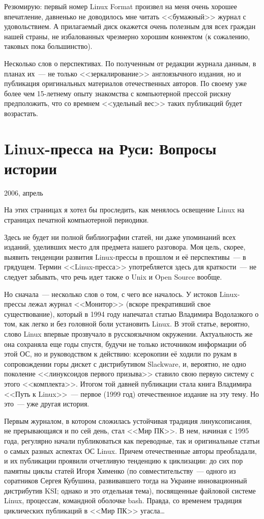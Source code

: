 Резюмирую: первый номер Linux Format произвел на меня очень хорошее впечатление, давненько не доводилось мне читать <<бумажный>> журнал с удовольствием. А прилагаемый диск окажется очень полезным для всех граждан нашей страны, не избалованных чрезмерно хорошим коннектом (к сожалению, таковых пока большинство).

Несколько слов о перспективах. По полученным от редакции журнала данным, в планах их~--- не только <<зеркалирование>> англоязычного издания, но и публикация оригинальных материалов отечественных авторов. По своему уже более чем 15-летнему опыту знакомства с компьютерной прессой рискну предположить, что со времнем <<удельный вес>> таких публикаций будет возрастать.

\section{Linux-пресса на Руси: Вопросы истории} 
\begin{timeline}2006, апрель\end{timeline}

На этих страницах я хотел бы проследить, как менялось освещение Linux на страницах печатной компьютерной периодики.

Здесь не будет ни полной библиографии статей, ни даже упоминаний всех изданий, уделивших место для предмета нашего разговора. Моя цель, скорее, выявить тенденции развития Linux-прессы в прошлом и её перспективы~--- в грядущем. Термин <<Linux-пресса>> употребляется здесь для краткости~--- не следует забывать, что речь идет также о Unix и Open Source вообще.

Но сначала~--- несколько слов о том, с чего все началось. У истоков Linux-прессы лежал журнал <<Монитор>> (вскоре прекративший свое существование), который в 1994 году напечатал статью Владимира Водолазкого о том, как легко и без головной боли установить Linux. В этой статье, вероятно, слово Linux впервые прозвучало в русскоязычном окружении. Актуальность же она сохраняла еще годы спустя, будучи не только источником информации об этой ОС, но и руководством к действию: ксерокопии её ходили по рукам в сопровождении горы дискет с дистрибутивом Slackware, и, вероятно, не одно поколение <<линуксоидов первого призыва>> ставило свою первую систему с этого <<комплекта>>. Итогом той давней публикации стала книга Владимира <<Путь к Linux>>~--- первое (1999 год) отечественное издание на эту тему. Но это~--- уже другая история.

Первым журналом, в котором сложилась устойчивая традиция линуксописания, не прерывающаяся и по сей день, стал <<Мир ПК>>. В нем, начиная с 1995 года, регулярно начали публиковаться как переводные, так и оригинальные статьи о самых разных аспектах ОС Linux. Причем отечественные авторы преобладали, и их публикации проявили отчетливую тенденцию к циклизации: до сих пор памятны циклы статей Игоря Хименко (по совместительству~--- одного из соратников Сергея Кубушина, развивавшего тогда на Украине инновационный дистрибутив KSI; однако и это отдельная тема), посвященные файловой системе Linux, процессам, командной оболочке bash. Правда, со временем традиция циклических публикаций в <<Мир ПК>> угасла…

